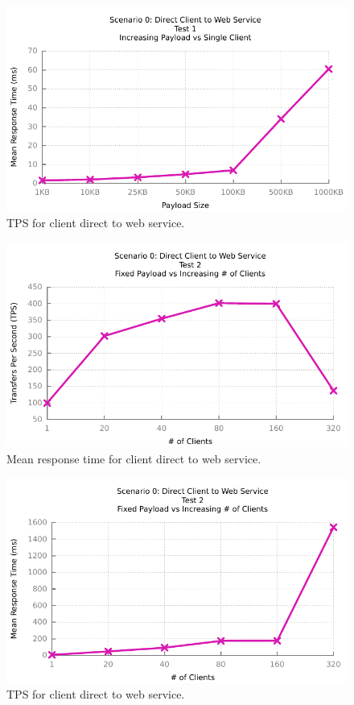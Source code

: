 \begin{figure}[H]
	\caption{TPS for client direct to web service.}
	\centerline{\includegraphics{img/direct_fu_ip_resp}}
	\label{fig:direct-1-2}
\end{figure}

\begin{figure}[H]
	\caption{Mean response time for client direct to web service.}
	\centerline{\includegraphics{img/direct_fp_iu_tps}}
	\label{fig:direct-2-1}
\end{figure}

\begin{figure}[H]
	\caption{TPS for client direct to web service.}
	\centerline{\includegraphics{img/direct_fp_iu_resp}}
	\label{fig:direct-2-2}
\end{figure}

